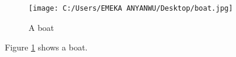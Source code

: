 \documentclass{article}
\begin{document}
		\begin{figure}
		\centering
		\texttt{[image: C:/Users/EMEKA ANYANWU/Desktop/boat.jpg]}
			\caption{A boat}
			\label{fig:boat}
		\end{figure}
		Figure \ref{fig:boat} shows a boat.
\end{document}
